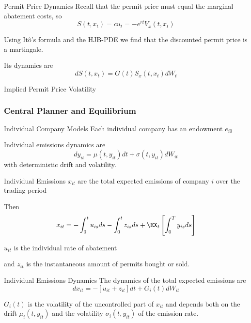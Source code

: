 Permit Price Dynamics
	Recall that the permit price must equal the marginal abatement costs, so
		\begin{equation}
		S(t,x_t) = c u_t = -e^{rt} V_x(t,x_t)
		\end{equation}
	
	Using It{\^o}'s formula and the HJB-PDE we find that the discounted permit price is a martingale.
 
	Its dynamics are
		\begin{equation}
		dS(t,x_t)= G(t)S_x(t,x_t) dW_t
		\end{equation}


Implied Permit Price Volatility
	\begin{center}
	\begin{figure}[h!]
	\centering
	\end{figure}
	\end{center}


\subsubsection{Central Planner and Equilibrium}
Individual Company Models
	Each individual company has an endowment $e_{i0}$
	
	Individual emissions dynamics are
	\begin{equation}
	dy_{it}= \mu(t, y_{it})dt + \sigma(t, y_{it})dW_{it}
	\end{equation}
	with deterministic drift and volatility.


Individual Emissions
	$x_{it}$ are the total expected emissions of company $i$ over the trading period
 
	Then
	\begin{equation}
	x_{it}=-\int_0^tu_{is} ds -\int_0^tz_{is}ds + \EX_t\left[\int_0^T y_{is} ds \right]
	\end{equation}
 
	$u_{it}$ is the individual rate of abatement
	
	and $z_{it}$ is the instantaneous amount of permits bought or sold.


Individual Emissions Dynamics
	The dynamics of the total expected emissions are
		\begin{equation}
		dx_{it}=-[u_{it}+z_{it}] dt + G_i(t) dW_{it}
		\end{equation}
	
	$G_i(t)$ is the volatility of the uncontrolled part of $x_{it}$ and depends both on the drift $\mu_i(t, y_{it})$
	and the volatility $\sigma_i(t,y_{it})$ of the emission rate.


